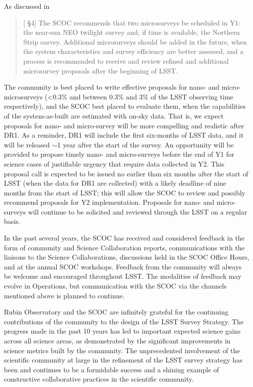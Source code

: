 As discussed in  
\begin{quote}
    {[ \S4] The SCOC recommends that two microsurveys be scheduled in Y1: the near-sun NEO twilight survey and, if time is available, the Northern Strip survey. Additional microsurveys should be added in the future, when the system characteristics and survey efficiency are better assessed, and a process is recommended to receive and review refined and additional microsurvey proposals after the beginning of LSST.}
\end{quote}

The community is best placed to write effective proposals for  nano- and micro-microsurveys (<0.3\% and between 0.3\% and 3\% of the LSST observing time respectively), and the SCOC best placed to evaluate them, when the capabilities of the system-as-built are estimated with on-sky data. That is, we expect proposals for nano- and micro-survey will be more compelling and realistic after DR1. As a reminder, DR1 will include the first six-months of LSST data, and it will be released \mbox{$\sim$1} year after the start of the survey. An opportunity will be provided to propose timely nano- and micro-surveys before the end of Y1 for science cases of justifiable urgency that require data collected in Y2. This proposal call is expected to be issued no earlier than six months after the start of LSST (when the data for DR1 are collected) with a likely deadline of nine months from the start of LSST; this will allow the SCOC to review and possibly recommend proposals for Y2 implementation. Proposals for nano- and micro-surveys will continue to be solicited and reviewed through the LSST on a regular basis. 

In the past several years, the SCOC has received and considered feedback in the form of community and Science Collaboration reports, communications with the liaisons to the Science Collaborations, discussions held in the SCOC Office Hours, and at the annual SCOC workshops. Feedback from the community will always be welcome and encouraged throughout LSST. The modalities of feedback may evolve in Operations, but communication with the SCOC via the channels mentioned above is planned to continue. 

Rubin Observatory and the SCOC are infinitely grateful for the continuing contributions of the community to the design of the LSST Survey Strategy. The progress made in the past 10 years has led to important expected science gains across all science areas, as demonstrated by the significant improvements in science metrics built by the community. The unprecedented involvement of the scientific community at large in the refinement of the LSST survey strategy has been and continues to be a formidable success and a shining example of constructive collaborative practices in the scientific community. 

